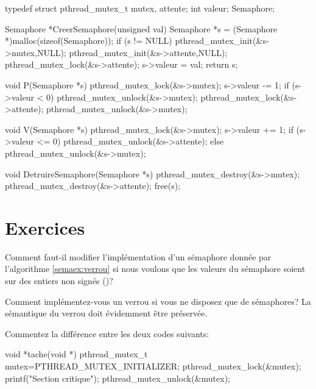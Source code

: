 \begin{codeblock}[label=semaex:verrou,title=Implémentation de sémaphores par verrous]
typedef struct {
    pthread_mutex_t mutex, attente;
    int valeur;
} Semaphore;

Semaphore *CreerSemaphore(unsigned val) {
    Semaphore *s = (Semaphore *)malloc(sizeof(Semaphore));
    if (s != NULL) {
        pthread_mutex_init(&s->mutex,NULL);
        pthread_mutex_init(&s->attente,NULL);
        pthread_mutex_lock(&s->attente);
        s->valeur = val;
    }
    return s;
}

void P(Semaphore *s) {
    pthread_mutex_lock(&s->mutex);
    s->valeur -= 1;
    if (s->valeur < 0) {
        pthread_mutex_unlock(&s->mutex);
        pthread_mutex_lock(&s->attente);
    }
    pthread_mutex_unlock(&s->mutex);
}

void V(Semaphore *s) {
    pthread_mutex_lock(&s->mutex);
    s->valeur += 1;
    if (s->valeur <= 0)
        pthread_mutex_unlock(&s->attente);
    else
        pthread_mutex_unlock(&s->mutex);
}

void DetruireSemaphore(Semaphore *s) {
    pthread_mutex_destroy(&s->mutex);
    pthread_mutex_destroy(&s->attente);
    free(s);
}
\end{codeblock}

\section{Exercices}

\startexercice

Comment faut-il modifier l'implémentation d'un sémaphore donnée par l'algorithme \ref{semaex:verrou} si nous voulons que les valeurs du sémaphore soient sur des entiers non signés ()?

\startexercice

Comment implémentez-vous un verrou si vous ne disposez que de sémaphores? La sémantique du verrou doit évidemment être préservée.


\startexercice

Commentez la différence entre les deux codes suivants:

\begin{codeblock}
void *tache(void *) {
  pthread_mutex_t mutex=PTHREAD_MUTEX_INITIALIZER;
  pthread_mutex_lock(&mutex);
  printf("Section critique\n");
  pthread_mutex_unlock(&mutex);
}
\end{codeblock}

